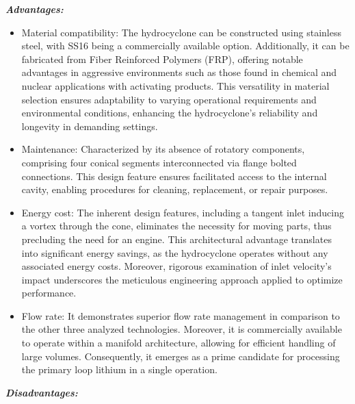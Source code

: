  \begin{tcolorbox}[colback=blue!5!white,enhanced,breakable,colframe=blue!75!black,title=Hydrocyclone]
 	
 	\textbf{\textit{Advantages:}}
 	\begin{itemize}
 		\item Material compatibility: The hydrocyclone can be constructed using stainless steel, with SS16 being a commercially available option. Additionally, it can be fabricated from Fiber Reinforced Polymers (FRP), offering notable advantages in aggressive environments such as those found in chemical and nuclear applications with activating products. This versatility in material selection ensures adaptability to varying operational requirements and environmental conditions, enhancing the hydrocyclone's reliability and longevity in demanding settings.
 		\item Maintenance: Characterized by its absence of rotatory components, comprising four conical segments interconnected via flange bolted connections. This design feature ensures facilitated access to the internal cavity, enabling procedures for cleaning, replacement, or repair purposes.
 		\item Energy cost: The inherent design features, including a tangent inlet inducing a vortex through the cone, eliminates the necessity for moving parts, thus precluding the need for an engine. This architectural advantage translates into significant energy savings, as the hydrocyclone operates without any associated energy costs. Moreover, rigorous examination of inlet velocity's impact underscores the meticulous engineering approach applied to optimize performance.
 		\item Flow rate: It demonstrates superior flow rate management in comparison to the other three analyzed technologies. Moreover, it is commercially available to operate within a manifold architecture, allowing for efficient handling of large volumes. Consequently, it emerges as a prime candidate for processing the primary loop lithium in a single operation.
 	\end{itemize}
 	
 	\textbf{\textit{Disadvantages:}}
 	

\end{tcolorbox}
